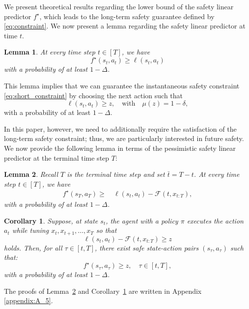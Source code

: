 \documentclass[letterpaper]{article} %
\newtheorem{lemma}
{Lemma}
\newtheorem{corollary}{Corollary}
\begin{document}
We present theoretical results regarding the lower bound of the safety linear predictor $f^\star$, which leads to the long-term safety guarantee defined by \eqref{eq:constraint}.
We now present a lemma regarding the safety linear predictor at time $t$.
%
\begin{lemma}
    \label{lemma:lower_bound}
    At every time step $t \in [T]$, we have
    \begin{equation}
        \label{eq:f_t}
        f^\star(s_t, a_t) \ge \ell(s_t, a_t)
    \end{equation}
    with a probability of at least $1-\Delta$.
\end{lemma}
%
\noindent
This lemma implies that we can guarantee the instantaneous safety constraint \eqref{eq:short_constraint} by choosing the next action such that
%
\begin{equation}
    \ell(s_t, a_t) \ge z, \quad \text{with} \quad \mu(z) = 1 - \delta,
\end{equation}
%
with a probability of at least $1 - \Delta$.

In this paper, however, we need to additionally require the satisfaction of the long-term safety constraint; thus, we are particularly interested in future safety.
We now provide the following lemma in terms of the pessimistic safety linear predictor at the terminal time step $T$:
%
\begin{lemma}
    \label{lemma:f_ell_T}
    Recall $T$ is the terminal time step and set $\bar{t} = T - t$.
    At every time step $t \in [T]$, we have
    \begin{align*}
        \label{eq:f_t_T}
        f^\star(s_T, a_T)
        \ge &\ \ell(s_t, a_t) - \mathcal{F}(t, x_{t:T}),
    \end{align*}
    with a probability of at least $1-\Delta$.
\end{lemma}

\begin{corollary}
    \label{corollary:safety}
    Suppose, at state $s_t$, the agent with a policy $\pi$ executes the action $a_t$ while tuning $x_t, x_{t+1}, \ldots, x_T$ so that
    \begin{equation}
        \label{eq:condition_safety}
        \ell(s_t, a_t) - \mathcal{F}(t, x_{t:T}) \ge z
    \end{equation}
    holds.
    Then, for all $\tau \in [t, T]$, there exist safe state-action pairs $(s_\tau, a_\tau)$ such that:
    \begin{equation}
        f^\star(s_\tau, a_\tau) \ge z, \quad \tau \in[t, T],
    \end{equation}
    with a probability of at least $1 - \Delta$.
\end{corollary}
%
\noindent
The proofs of Lemma~\ref{lemma:f_ell_T} and Corollary~\ref{corollary:safety} are written in
Appendix \ref{appendix:A_5}.
\end{document}
